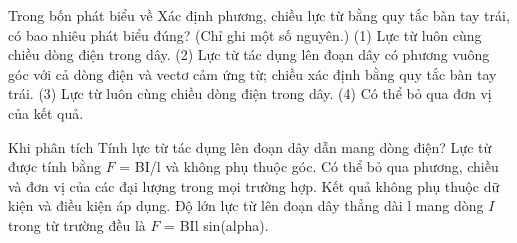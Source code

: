 \begin{ex}
Trong bốn phát biểu về Xác định phương, chiều lực từ bằng quy tắc bàn tay trái, có bao nhiêu phát biểu đúng? (Chỉ ghi một số nguyên.) (1) Lực từ luôn cùng chiều dòng điện trong dây. (2) Lực từ tác dụng lên đoạn dây có phương vuông góc với cả dòng điện và vectơ cảm ứng từ; chiều xác định bằng quy tắc bàn tay trái. (3) Lực từ luôn cùng chiều dòng điện trong dây. (4) Có thể bỏ qua đơn vị của kết quả.
\end{ex}

\begin{ex}
Khi phân tích Tính lực từ tác dụng lên đoạn dây dẫn mang dòng điện?
\choice
{Lực từ được tính bằng $F$ = BI/l và không phụ thuộc góc.}
{Có thể bỏ qua phương, chiều và đơn vị của các đại lượng trong mọi trường hợp.}
{Kết quả không phụ thuộc dữ kiện và điều kiện áp dụng.}
{\True Độ lớn lực từ lên đoạn dây thẳng dài l mang dòng $I$ trong từ trường đều là $F$ = BIl sin(alpha).}
\end{ex}

